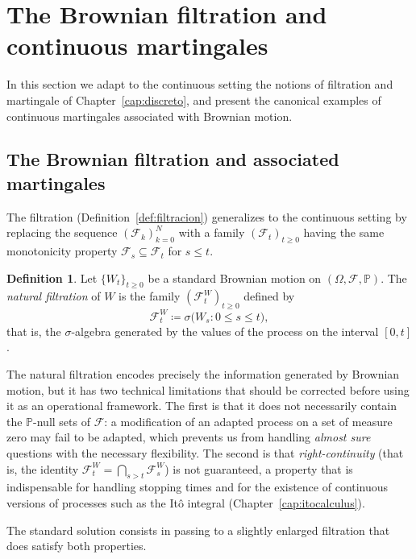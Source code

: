 \documentclass[11pt,a4paper,oneside]{report}
\theoremstyle{plain}
\theoremstyle{definition}
\newtheorem{definicion}[teorema]{Definition}
\theoremstyle{remark}
\newcommand{\PP}{\mathbb{P}}
\newcommand{\F}{\mathcal{F}}
\newcommand{\1}{\mathbf{1}}
\newcommand{\eqdef}{\coloneqq}
\begin{document}
\section{The Brownian filtration and continuous martingales}
\label{sec:filtracion_browniana}

In this section we adapt to the continuous setting the notions of
filtration and martingale of Chapter~\ref{cap:discreto}, and present the
canonical examples of continuous martingales associated with Brownian motion.

\subsection{The Brownian filtration and associated martingales}
\label{subsec:filtracion_y_martingalas}

The
filtration (Definition~\ref{def:filtracion}) generalizes to the
continuous setting by replacing the sequence $(\F_k)_{k=0}^N$ with a
family $(\F_t)_{t \geq 0}$ having the same monotonicity property
$\F_s \subseteq \F_t$ for $s \leq t$.

\begin{definicion}
\label{def:filtracion_browniana}
Let $\{W_t\}_{t \geq 0}$ be a standard Brownian motion on
$(\Omega, \F, \PP)$. The \emph{natural filtration} of $W$ is the
family $(\F_t^W)_{t \geq 0}$ defined by
\begin{equation*}
  \F_t^W \eqdef \sigma\bigl(W_s : 0 \leq s \leq t\bigr),
\end{equation*}
that is, the $\sigma$-algebra generated by the values of the process
on the interval $[0, t]$.
\end{definicion}

The natural filtration encodes precisely the information generated by
Brownian motion, but it has two technical limitations that should be
corrected before using it as an operational framework. The first is
that it does not necessarily contain the $\PP$-null sets of $\F$: a
modification of an adapted process on a set of measure zero may fail
to be adapted, which prevents us from handling \emph{almost sure}
questions with the necessary flexibility. The second is that
\emph{right-continuity} (that is, the identity
$\F_t^W = \bigcap_{s > t} \F_s^W$) is not guaranteed, a property that
is indispensable for handling stopping times and for the existence of
continuous versions of processes such as the Itô integral
(Chapter~\ref{cap:itocalculus}).

The standard solution consists in passing to a slightly enlarged
filtration that does satisfy both properties.
\end{document}
